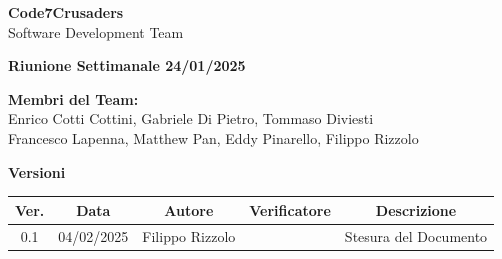 \documentclass{article}
\begin{document}
\begin{titlepage}
    {\Huge \textbf{Code7Crusaders}}\\
    \vspace{0.5cm}
    {\Large Software Development Team}\\
    \vspace{2cm}
        
        {\large \textbf{Riunione Settimanale 24/01/2025}}\\
    \vspace{5cm}                           %
    
    
    \textbf{Membri del Team:}\\
    Enrico Cotti Cottini, Gabriele Di Pietro, Tommaso Diviesti \\
    Francesco Lapenna, Matthew Pan, Eddy Pinarello, Filippo Rizzolo \\
    \vspace{0.5cm}
    
    \vspace{1cm}
\end{titlepage}



\newpage
\begin{table}[h!]
\centering
\textbf{Versioni} \\ %
\vspace{2mm} %
\begin{tabular}{|c|c|c|c|c|}
    \hline
    \textbf{Ver.} & \textbf{Data} & \textbf{Autore} & \textbf{Verificatore} & \textbf{Descrizione} \\
    \hline
    0.1 & 04/02/2025 & Filippo Rizzolo &  & Stesura del Documento \\ 
    \hline                                  %
\end{tabular}
\end{table}



\newpage
\end{document}
